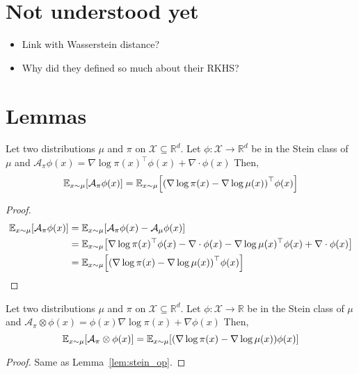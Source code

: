 \documentclass[runningheads,a4paper]{llncs}
\newcommand{\R}{\mathbb{R}}
\newcommand{\E}{\mathbb{E}}
\newcommand{\X}{\mathcal{X}}
\newcommand{\A}{\mathcal{A}}
\DeclarePairedDelimiter{\pare}{(}{)}
\DeclarePairedDelimiter{\sq}{[}{]}
\begin{document}
\section{Not understood yet}
\begin{itemize}
  \item Link with Wasserstein distance?
  \item Why did they defined so much about their RKHS?
\end{itemize}




\appendix
\section{Lemmas}
\begin{lemma}
  Let two distributions $\mu$ and $\pi$ on $\X \subseteq \R^d$.
  Let $\phi: \X \to \R^d$ be in the Stein class of $\mu$ and
  $\A_\pi \phi(x) = \nabla \log \pi(x)^\top \phi(x) + \nabla \cdot \phi(x)$ Then,
  $$
  \E_{x \sim \mu}\sq*{ \A_\pi \phi(x) } =
    \E_{x \sim \mu}\sq*{ \pare*{\nabla \log \pi(x) - \nabla \log \mu(x)}^\top \phi(x) }
  $$
  \begin{proof}
    \begin{align*}
      \E_{x \sim \mu}\sq*{ \A_\pi \phi(x) } &= \E_{x \sim \mu}\sq*{ \A_\pi \phi(x) - \A_\mu \phi(x) } \\
      &= \E_{x \sim \mu}\sq*{ \nabla \log \pi(x)^\top \phi(x) - \nabla \cdot \phi(x) -
      \nabla \log \mu(x)^\top \phi(x) + \nabla \cdot \phi(x) } \\
      &= \E_{x \sim \mu}\sq*{ \pare*{\nabla \log \pi(x) - \nabla \log \mu(x)}^\top \phi(x) }
    \end{align*}
  \end{proof}
  \label{lem:stein_op}
\end{lemma}

\begin{lemma}
  Let two distributions $\mu$ and $\pi$ on $\X \subseteq \R^d$.
  Let $\phi: \X \to \R$ be in the Stein class of $\mu$ and
  $\A_\pi \otimes \phi(x) = \phi(x) \nabla \log \pi(x) + \nabla \phi(x)$ Then,
  $$
  \E_{x \sim \mu}\sq*{ \A_\pi \otimes \phi(x) } =
    \E_{x \sim \mu}\sq*{ \pare*{\nabla \log \pi(x) - \nabla \log \mu(x)} \phi(x) }
  $$
  \begin{proof}
    Same as Lemma~\ref{lem:stein_op}.
  \end{proof}
  \label{lem:stein_op_scalar}
\end{lemma}
\end{document}
